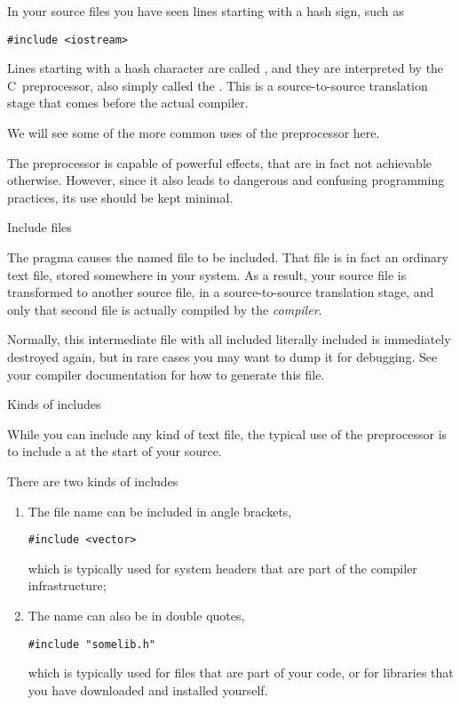 
In your source files you have seen lines starting with a hash sign,
such as
\begin{lstlisting}[lastline=1]
#include <iostream>
\end{lstlisting}
Lines starting with a hash character
are called ,
and they are interpreted by the 
%
C~preprocessor,
also simply called the .
%
This is a source-to-source translation stage that comes before the actual compiler.

We will see some of the more common uses of the preprocessor here.

\begin{bestpractice}
  The preprocessor is capable of powerful effects,
  that are in fact not achievable otherwise.
  However, since it also leads to dangerous and confusing
  programming practices,
  its use should be kept minimal.
\end{bestpractice}

 {Include files}

The  pragma causes the named file to be included.
That file is in fact an ordinary text file, stored somewhere in your system.
As a result,
your source file is transformed to another source file, in a
source-to-source translation stage,
and only that second file is actually compiled by the
%
\emph{compiler}.

Normally, this intermediate file with all included literally included
is immediately destroyed again, but
in rare cases you may want to dump it for debugging.
See your compiler documentation for how to generate this file.

 {Kinds of includes}

While you can include any kind of text file,
the typical use of the preprocessor
is to include a
at the start of your source.

There are two kinds of includes
\begin{enumerate}
\item The file name can be included in angle brackets,
\begin{lstlisting}
#include <vector>
\end{lstlisting}
  which is typically used for system headers that are part of the
  compiler infrastructure;
\item The name can also be in double quotes,
\begin{lstlisting}
#include "somelib.h"
\end{lstlisting}
  which is typically used for files that are part of your code,
  or for libraries that you have downloaded and installed yourself.
\end{enumerate}


